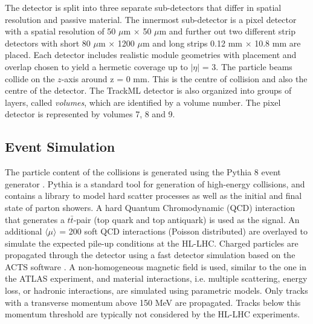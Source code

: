 The detector is split into three separate sub-detectors that differ in spatial resolution and passive material. The innermost sub-detector is a pixel detector with a spatial resolution of 50 $\mu$m $\times$ 50 $\mu$m and further out two different strip detectors with short 80 $\mu$m × 1200 $\mu$m and long strips 0.12 mm $\times$ 10.8 mm are placed. Each detector includes realistic module geometries with placement and overlap chosen to yield a hermetic coverage up to $\lvert \eta \rvert$ = 3. The particle beams collide on the $z$-axis around z = 0 mm. This is the centre of collision and also the centre of the detector. The TrackML detector is also organized into groups of layers, called \textit{volumes}, which are identified by a volume number. The pixel detector is represented by volumes 7, 8 and 9.






\subsection{Event Simulation}
\label{trackml-simulation}
The particle content of the collisions is generated using the Pythia 8 event generator \cite{pythia-8}. Pythia is a standard tool for generation of high-energy collisions, and contains a library to model hard scatter processes as well as the initial and final state of parton showers. A hard Quantum Chromodynamic (QCD) interaction that generates a $t\bar{t}$-pair (top quark and top antiquark) is used as the signal. An additional $\langle \mu \rangle$ = 200 soft QCD interactions (Poisson distributed) are overlayed to simulate the expected pile-up conditions at the HL-LHC. Charged particles are propagated through the detector using a fast detector simulation based on the ACTS software \cite{Gumpert_2017}. A non-homogeneous magnetic field is used, similar to the one in the ATLAS experiment, and material interactions, i.e. multiple scattering, energy loss, or hadronic interactions, are simulated using parametric models. Only tracks with a transverse momentum above 150 MeV are propagated. Tracks below this momentum threshold are typically not considered by the HL-LHC experiments.

